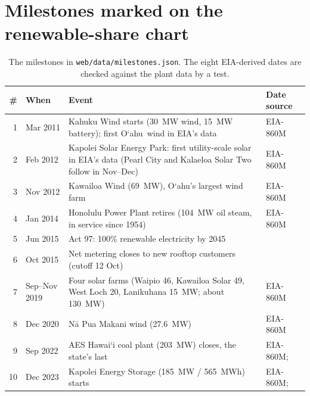 \documentclass[11pt,a4paper]{article}
\newcommand{\okina}{\textquoteleft}
\newcommand{\Oahu}{\texorpdfstring{O\okina ahu}{Oahu}}
\begin{document}
\section{Milestones marked on the renewable-share chart}
\begin{table}[htbp]
\centering\footnotesize
\begin{tabularx}{\textwidth}{@{}r>{\raggedright\arraybackslash}p{2.1cm}>{\raggedright\arraybackslash}X>{\raggedright\arraybackslash}p{3.3cm}@{}}
\toprule
\# & When & Event & Date source \\
\midrule
1 & Mar 2011 & Kahuku Wind starts (30~MW wind, 15~MW battery); first \Oahu\ wind in EIA's data & EIA-860M \\
2 & Feb 2012 & Kapolei Solar Energy Park: first utility-scale solar in EIA's data (Pearl City and Kalaeloa Solar Two follow in Nov--Dec) & EIA-860M \\
3 & Nov 2012 & Kawailoa Wind (69~MW), \Oahu's largest wind farm & EIA-860M \\
4 & Jan 2014 & Honolulu Power Plant retires (104~MW oil steam, in service since 1954) & EIA-860M \\
5 & Jun 2015 & Act 97: 100\% renewable electricity by 2045 & \cite{utilitydive-act97} \\
6 & Oct 2015 & Net metering closes to new rooftop customers (cutoff 12 Oct) & \cite{pvmag-netmetering} \\
7 & Sep--Nov 2019 & Four solar farms (Waipio 46, Kawailoa Solar 49, West Loch 20, Lanikuhana 15~MW; about 130~MW) & EIA-860M \\
8 & Dec 2020 & N\={a} Pua Makani wind (27.6~MW) & EIA-860M \\
9 & 1 Sep 2022 & AES Hawai\okina i coal plant (203~MW) closes, the state's last & EIA-860M; \cite{hpr-coal} \\
10 & Dec 2023 & Kapolei Energy Storage (185~MW / 565~MWh) starts & EIA-860M; \cite{utilitydive-kapolei} \\
\bottomrule
\end{tabularx}
\caption{The milestones in \texttt{web/data/milestones.json}. The eight EIA-derived dates are checked against the plant data by a test.}
\end{table}
\end{document}
